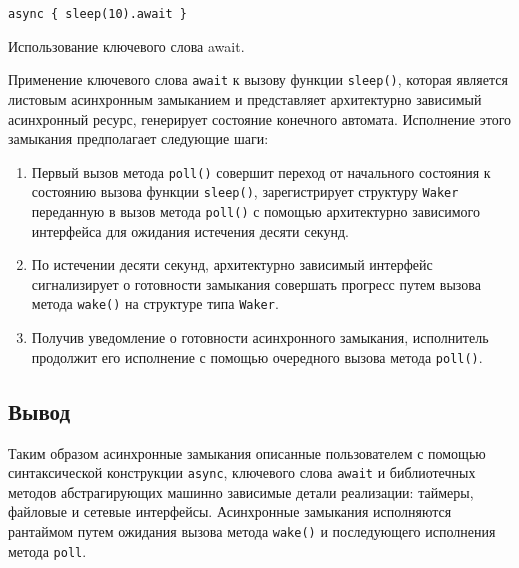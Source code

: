 \begin{listing}[H]
    \begin{verbatim}
async { sleep(10).await }
    \end{verbatim}

    \caption{Использование ключевого слова await.}
    \label{listing:async_sleep}
\end{listing}

Применение ключевого слова \verb|await| к вызову функции \verb|sleep()|, которая является листовым асинхронным замыканием и представляет архитектурно зависимый асинхронный ресурс, генерирует состояние конечного автомата. Исполнение этого замыкания предполагает следующие шаги:

\begin{enumerate}
    \item Первый вызов метода \verb|poll()| совершит переход от начального состояния к состоянию вызова функции \verb|sleep()|, зарегистрирует структуру \verb|Waker| переданную в вызов метода \verb|poll()| с помощью архитектурно зависимого интерфейса для ожидания истечения десяти секунд.
    \item По истечении десяти секунд, архитектурно зависимый интерфейс сигнализирует о готовности замыкания совершать прогресс путем вызова метода \verb|wake()| на структуре типа \verb|Waker|.
    \item Получив уведомление о готовности асинхронного замыкания, исполнитель продолжит его исполнение с помощью очередного вызова метода \verb|poll()|.
\end{enumerate}

\subsection{Вывод}

Таким образом асинхронные замыкания описанные пользователем с помощью синтаксической конструкции \verb|async|, ключевого слова \verb|await| и библиотечных методов абстрагирующих машинно зависимые детали реализации: таймеры, файловые и сетевые интерфейсы. Асинхронные замыкания исполняются рантаймом путем ожидания вызова метода \verb|wake()| и последующего исполнения метода \verb|poll|.
